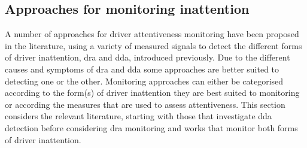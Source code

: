 \documentclass[11pt, parskip=half*,twoside=false]{scrbook}
\begin{document}
\subsection{Approaches for monitoring inattention} \label{ssec:approaches}
%
%
A number of approaches for driver attentiveness monitoring have been proposed in the literature, using a variety of measured signals to detect the different forms of driver inattention, \gls{dra} and \gls{dda}, introduced previously. Due to the different causes and symptoms of \gls{dra} and \gls{dda} some approaches are better suited to detecting one or the other. Monitoring approaches can either be categorised according to the form(s) of driver inattention they are best suited to monitoring or according the measures that are used to assess attentiveness. This section considers the relevant literature, starting with those that investigate \gls{dda} detection before considering \gls{dra} monitoring and works that monitor both forms of driver inattention.
\end{document}
